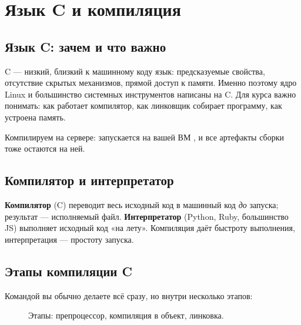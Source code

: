 \chapter{Язык C и компиляция}
\label{ch:13-c-compilation}

\section{Язык C: зачем и что важно}

C --- низкий, близкий к машинному коду язык: предсказуемые
свойства, отсутствие скрытых механизмов, прямой доступ к
памяти. Именно поэтому ядро Linux и большинство системных
инструментов написаны на C. Для курса важно понимать:
как работает компилятор, как линковщик собирает программу,
как устроена память.

Компилируем на сервере:  запускается на вашей ВМ
, и все артефакты сборки тоже остаются на ней.

\section{Компилятор и интерпретатор}

\textbf{Компилятор} (C) переводит весь исходный код в
машинный код \emph{до} запуска; результат --- исполняемый
файл. \textbf{Интерпретатор} (Python, Ruby, большинство
JS) выполняет исходный код «на лету». Компиляция даёт
быстроту выполнения, интерпретация --- простоту запуска.

\section{Этапы компиляции C}

Командой  вы обычно делаете всё сразу, но внутри
несколько этапов:

\begin{figure}[htb]
  \centering
  \caption{Этапы: препроцессор, компиляция в объект, линковка.}
  \label{fig:c-pipeline}
\end{figure}

